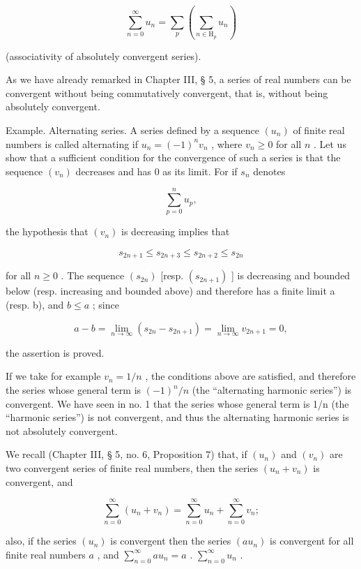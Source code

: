 \[
\sum_ {n = 0} ^ {\infty} u _ {n} = \sum_ {p} \left(\sum_ {n \in \mathrm{H} _ {p}} u _ {n}\right)
\]

(associativity of absolutely convergent series).

As we have already remarked in Chapter III, § 5, a series of real numbers can be convergent without being commutatively convergent, that is, without being absolutely convergent.

Example. Alternating series. A series defined by a sequence \((u_n)\) of finite real numbers is called alternating if \(u_n = (-1)^n v_n\) , where \(v_n \geqslant 0\) for all \(n\) . Let us show that a sufficient condition for the convergence of such a series is that the sequence \((v_n)\) decreases and has \(0\) as its limit. For if \(s_n\) denotes

\[
\sum_ {p = 0} ^ {n} u _ {p},
\]

the hypothesis that \((v_{n})\) is decreasing implies that

\[
s _ {2 n + 1} \leqslant s _ {2 n + 3} \leqslant s _ {2 n + 2} \leqslant s _ {2 n}
\]

for all \(n \geqslant 0\) . The sequence \((s_{2n})\) {[}resp. \((s_{2n+1})\) {]} is decreasing and bounded below (resp. increasing and bounded above) and therefore has a finite limit a (resp. b), and \(b \leqslant a\) ; since

\[
a - b = \lim _ {n \rightarrow \infty} (s _ {2 n} - s _ {2 n + 1}) = \lim _ {n \rightarrow \infty} v _ {2 n + 1} = 0,
\]

the assertion is proved.

If we take for example \(v_{n}=1/n\) , the conditions above are satisfied, and therefore the series whose general term is \((-1)^{n}/n\) (the ``alternating harmonic series'') is convergent. We have seen in no. 1 that the series whose general term is 1/n (the ``harmonic series'') is not convergent, and thus the alternating harmonic series is not absolutely convergent.

We recall (Chapter III, § 5, no. 6, Proposition 7) that, if \((u_n)\) and \((v_n)\) are two convergent series of finite real numbers, then the series \((u_n + v_n)\) is convergent, and

\[
\sum_ {n = 0} ^ {\infty} \left(u _ {n} + v _ {n}\right) = \sum_ {n = 0} ^ {\infty} u _ {n} + \sum_ {n = 0} ^ {\infty} v _ {n};
\]

also, if the series \((u_{n})\) is convergent then the series \((au_{n})\) is convergent for all finite real numbers \(a\) , and \(\sum_{n=0}^{\infty} au_{n} = a\) . \(\sum_{n=0}^{\infty} u_{n}\) .

